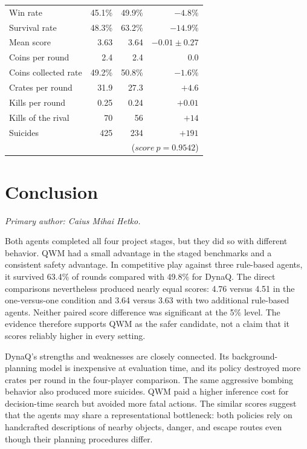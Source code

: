 \documentclass[article, 10pt]{IEEEtran}
\begin{document}
\begin{table}[t]
\begin{tabular}{lrrr}
    \quad Win rate           & 45.1\%  & 49.9\%  & $-4.8\%$ \\
    \quad Survival rate      & 48.3\% & 63.2\% & $-14.9\%$ \\
    \quad Mean score         & 3.63 & 3.64 & $-0.01 \pm 0.27$ \\
    \quad Coins per round    & 2.4  & 2.4  & $0.0$ \\
    \quad Coins collected rate  & 49.2\%  & 50.8\%  & $-1.6\%$ \\
    \quad Crates per round   & 31.9 & 27.3 & $+4.6$ \\
    \quad Kills per round    & 0.25 & 0.24 & $+0.01$ \\
    \quad Kills of the rival & 70   & 56   & $+14$ \\
    \quad Suicides           & 425  & 234  & $+191$ \\
    \quad                    & \multicolumn{3}{r}{($score\ p = 0.9542$)} \\
    \bottomrule
  \end{tabular}
\end{table}





\section{Conclusion}\label{sec:7_conclusion}

\textit{Primary author: Caius Mihai Hetko.}

Both agents completed all four project stages, but they did so with different behavior. QWM had a small advantage in the staged benchmarks and a consistent safety advantage. In competitive play against three rule-based agents, it survived 63.4\% of rounds compared with 49.8\% for DynaQ. The direct comparisons nevertheless produced nearly equal scores: 4.76 versus 4.51 in the one-versus-one condition and 3.64 versus 3.63 with two additional rule-based agents. Neither paired score difference was significant at the 5\% level. The evidence therefore supports QWM as the safer candidate, not a claim that it scores reliably higher in every setting.

DynaQ's strengths and weaknesses are closely connected. Its background-planning model is inexpensive at evaluation time, and its policy destroyed more crates per round in the four-player comparison. The same aggressive bombing behavior also produced more suicides. QWM paid a higher inference cost for decision-time search but avoided more fatal actions. The similar scores suggest that the agents may share a representational bottleneck: both policies rely on handcrafted descriptions of nearby objects, danger, and escape routes even though their planning procedures differ.
\end{document}
